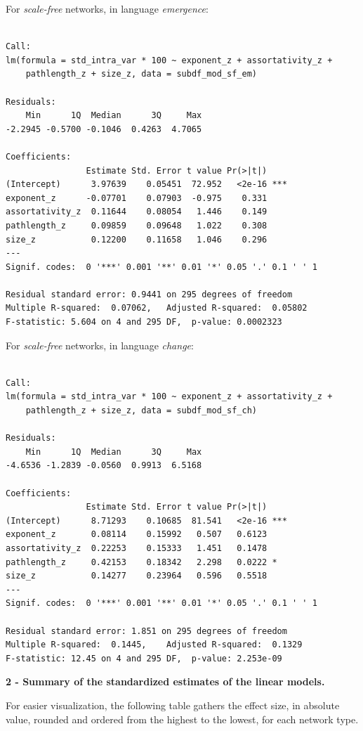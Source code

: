 \documentclass[
]{article}
\begin{document}
For \emph{scale-free} networks, in language \emph{emergence}:

\begin{verbatim}

Call:
lm(formula = std_intra_var * 100 ~ exponent_z + assortativity_z + 
    pathlength_z + size_z, data = subdf_mod_sf_em)

Residuals:
    Min      1Q  Median      3Q     Max 
-2.2945 -0.5700 -0.1046  0.4263  4.7065 

Coefficients:
                Estimate Std. Error t value Pr(>|t|)    
(Intercept)      3.97639    0.05451  72.952   <2e-16 ***
exponent_z      -0.07701    0.07903  -0.975    0.331    
assortativity_z  0.11644    0.08054   1.446    0.149    
pathlength_z     0.09859    0.09648   1.022    0.308    
size_z           0.12200    0.11658   1.046    0.296    
---
Signif. codes:  0 '***' 0.001 '**' 0.01 '*' 0.05 '.' 0.1 ' ' 1

Residual standard error: 0.9441 on 295 degrees of freedom
Multiple R-squared:  0.07062,   Adjusted R-squared:  0.05802 
F-statistic: 5.604 on 4 and 295 DF,  p-value: 0.0002323
\end{verbatim}

For \emph{scale-free} networks, in language \emph{change}:

\begin{verbatim}

Call:
lm(formula = std_intra_var * 100 ~ exponent_z + assortativity_z + 
    pathlength_z + size_z, data = subdf_mod_sf_ch)

Residuals:
    Min      1Q  Median      3Q     Max 
-4.6536 -1.2839 -0.0560  0.9913  6.5168 

Coefficients:
                Estimate Std. Error t value Pr(>|t|)    
(Intercept)      8.71293    0.10685  81.541   <2e-16 ***
exponent_z       0.08114    0.15992   0.507   0.6123    
assortativity_z  0.22253    0.15333   1.451   0.1478    
pathlength_z     0.42153    0.18342   2.298   0.0222 *  
size_z           0.14277    0.23964   0.596   0.5518    
---
Signif. codes:  0 '***' 0.001 '**' 0.01 '*' 0.05 '.' 0.1 ' ' 1

Residual standard error: 1.851 on 295 degrees of freedom
Multiple R-squared:  0.1445,    Adjusted R-squared:  0.1329 
F-statistic: 12.45 on 4 and 295 DF,  p-value: 2.253e-09
\end{verbatim}

\textbf{2 - Summary of the standardized estimates of the linear models.}

For easier visualization, the following table gathers the effect size,
in absolute value, rounded and ordered from the highest to the lowest,
for each network type.
\end{document}

